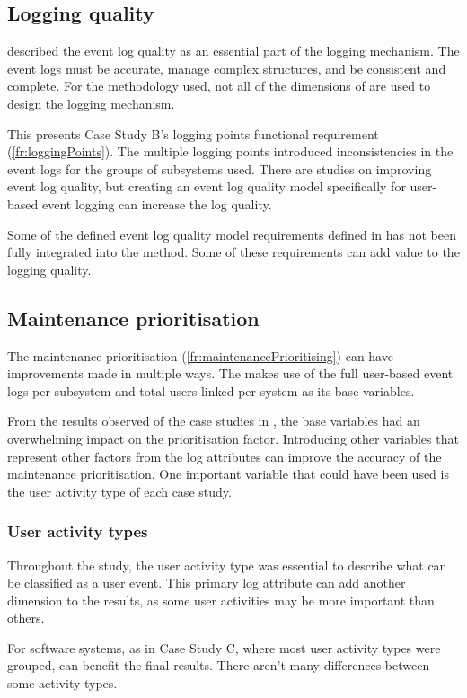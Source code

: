 \subsection{Logging quality}
 described the event log quality as an essential part of the logging mechanism. The event logs must be accurate, manage complex structures, and be consistent and complete. For the methodology used, not all of the dimensions of  are used to design the logging mechanism.\par This presents Case Study B's logging points functional requirement (\ref{fr:loggingPoints}). The multiple logging points introduced inconsistencies in the event logs for the groups of subsystems used. There are studies on improving event log quality, but creating an event log quality model specifically for user-based event logging can increase the log quality. \par Some of the defined event log quality model requirements defined in  has not been fully integrated into the method. Some of these requirements can add value to the logging quality.

\subsection{Maintenance prioritisation}
The maintenance prioritisation (\ref{fr:maintenancePrioritising}) can have improvements made in multiple ways. The  makes use of the full user-based event logs per subsystem and total users linked per system as its base variables.\par From the results observed of the case studies in , the base variables had an overwhelming impact on the prioritisation factor. Introducing other variables that represent other factors from the log attributes can improve the accuracy of the maintenance prioritisation. One important variable that could have been used is the user activity type of each case study.

\subsubsection{User activity types}
Throughout the study, the user activity type was essential to describe what can be classified as a user event. This primary log attribute can add another dimension to the results, as some user activities may be more important than others. \par For software systems, as in Case Study C, where most user activity types were grouped, can benefit the final results. There aren't many differences between some activity types. 

